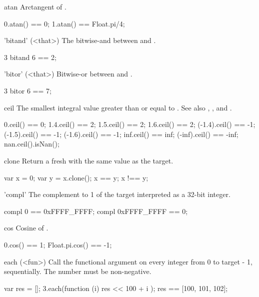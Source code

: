 \begin{urbiscriptapi}
\item[atan] Arctangent of \this.
\begin{urbiassert}
0.atan() == 0;
1.atan() == Float.pi/4;
\end{urbiassert}


\item['bitand'](<that>)%
  The bitwise-and between \this and .
\begin{urbiassert}
3 bitand 6 == 2;
\end{urbiassert}


\item['bitor'](<that>)%
  Bitwise-or between \this and .
\begin{urbiassert}
3 bitor 6 == 7;
\end{urbiassert}


\item[ceil] The smallest integral value greater than or equal to \this.  See
  also , , and .
\begin{urbiassert}
     0.ceil() ==  0;
   1.4.ceil() ==  2;     1.5.ceil() ==  2;    1.6.ceil() ==  2;
(-1.4).ceil() == -1;  (-1.5).ceil() == -1; (-1.6).ceil() == -1;
   inf.ceil() == inf; (-inf).ceil() == -inf;
   nan.ceil().isNan();
\end{urbiassert}


\item[clone]
  Return a fresh  with the same value as the target.
\begin{urbiassert}
var x = 0;
var y = x.clone();
x == y;  x !== y;
\end{urbiassert}


\item['compl']
  The complement to 1 of the target interpreted as a 32-bit integer.
\begin{urbiassert}
compl 0 == 0xFFFF_FFFF;    compl 0xFFFF_FFFF == 0;
\end{urbiassert}


\item[cos]
  Cosine of \this.
\begin{urbiassert}
0.cos() == 1;   Float.pi.cos() == -1;
\end{urbiassert}


\item[each](<fun>)%
  Call the functional argument  on every integer from 0 to
  target - 1, sequentially.  The number must be non-negative.
\begin{urbiassert}
{
  var res = [];
  3.each(function (i) { res << 100 + i });
  res
}
== [100, 101, 102];


\end{urbiassert}
\end{urbiscriptapi}
